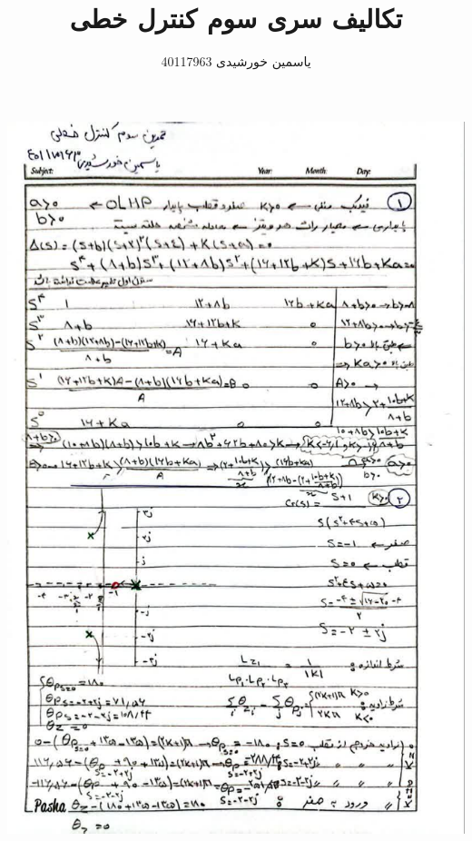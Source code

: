 \documentclass[a4,12pt]{article}
\title{ تکالیف سری سوم کنترل خطی}
\author{یاسمین خورشیدی 40117963}
\begin{document}
	\maketitle
		
			\centering
			\includegraphics[width=15cm]{q1,2.jpg}
\end{document}
